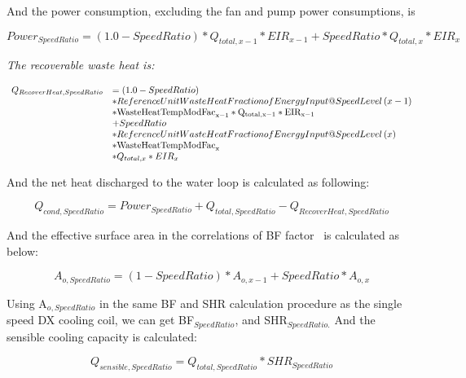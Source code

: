 And the power consumption, excluding the fan and pump power consumptions, is

\begin{equation}
Powe{r_{SpeedRatio}} = \left( {1.0 - SpeedRatio} \right)*{Q_{total,x - 1}}*EI{R_{x - 1}} + SpeedRatio*{Q_{total,x}}*EI{R_x}
\end{equation}

\emph{The recoverable waste heat is:}

\begin{equation}
  \begin{array}{rl}
    Q_{RecoverHeat,SpeedRatio} &= \left( {1.0 - SpeedRatio} \right) \\
                               &* ReferenceUnitWasteHeatFractionofEnergyInput@SpeedLevel\left( {x - 1} \right) \\
                               &* \rm{WasteHeatTempModFac}_{x - 1} * {Q_{total,x - 1}} * EIR_{x - 1} \\
                               &+ SpeedRatio \\
                               &* ReferenceUnitWasteHeatFractionofEnergyInput@SpeedLevel\left( x \right) \\
                               &* \rm{WasteHeatTempModFac}_x \\
                               &* Q_{total,x} * EIR_x
  \end{array}
\end{equation}

And the net heat discharged to the water loop is calculated as following:

\begin{equation}
{Q_{cond,SpeedRatio}} = Powe{r_{SpeedRatio}} + {Q_{total,SpeedRatio}} - {Q_{RecoverHeat,SpeedRatio}}
\end{equation}

And the effective surface area in the correlations of BF factor ~is calculated as below:

\begin{equation}
{A_{o,SpeedRatio}} = \left( {1 - SpeedRatio} \right)*{A_{o,x - 1}} + SpeedRatio*{A_{o,x}}
\end{equation}

Using A\(_{o,SpeedRatio}\) in the same BF and SHR calculation procedure as the single speed DX cooling coil, we can get BF\(_{SpeedRatio}\), and SHR\(_{SpeedRatio.}\) And the sensible cooling capacity is calculated:

\begin{equation}
{Q_{sensible,SpeedRatio}} = {Q_{total,SpeedRatio}}*SH{R_{SpeedRatio}}
\end{equation}

